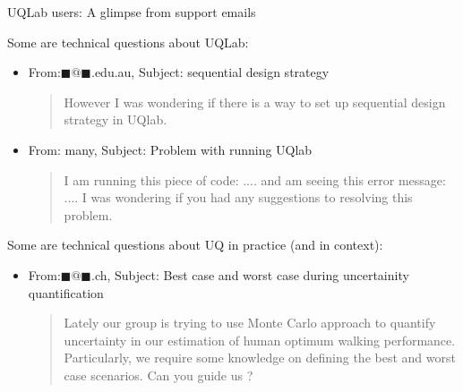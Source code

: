 \documentclass[]{rsuqbeamernew}
\begin{document}
\begin{frame}{UQLab users: A glimpse from support emails}
  
  Some are technical questions about UQLab:
  \begin{itemize}
    \item From:$\blacksquare@\blacksquare$.edu.au, Subject: sequential design strategy
    \begin{quotation}
      However I was wondering if there is a way to set up sequential design strategy in UQlab. 
    \end{quotation}
    \item From: many, Subject: Problem with running UQlab
    \begin{quotation}
      I am running this piece of code:
      ....
      and am seeing this error message:
      ....
      I was wondering if you had any suggestions to resolving this problem.
    \end{quotation}
  \end{itemize}

  Some are technical questions about UQ in practice (and in context):
  \begin{itemize}
      \item From:$\blacksquare@\blacksquare$.ch, Subject: Best case and worst case during uncertainity quantification
      \begin{quotation}
      Lately our group is trying to use Monte Carlo approach to quantify uncertainty in our estimation of human optimum walking performance. Particularly, we require some knowledge on defining the best and worst case scenarios. Can you guide us ? 
    \end{quotation}
  \end{itemize}


\end{frame}
\end{document}
